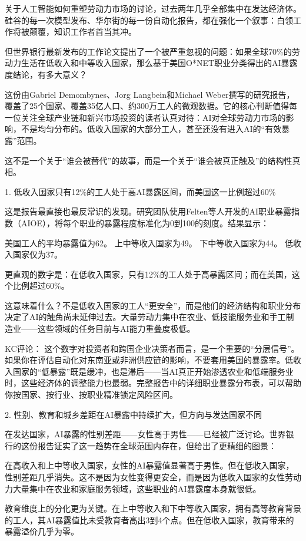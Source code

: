 \documentclass[11pt]{ctexart}
\begin{document}
关于人工智能如何重塑劳动力市场的讨论，过去两年几乎全部集中在发达经济体。硅谷的每一次模型发布、华尔街的每一份自动化报告，都在强化一个叙事：白领工作将被颠覆，知识工作者首当其冲。

但世界银行最新发布的工作论文提出了一个被严重忽视的问题：如果全球70\%的劳动力生活在低收入和中等收入国家，那么基于美国O*NET职业分类得出的AI暴露度结论，有多大意义？

这份由Gabriel Demombynes、Jorg Langbein和Michael Weber撰写的研究报告，覆盖了25个国家、覆盖35亿人口、约300万工人的微观数据。它的核心判断值得每一位关注全球产业链和新兴市场投资的读者认真对待：AI对全球劳动力市场的影响，不是均匀分布的。低收入国家的大部分工人，甚至还没有进入AI的“有效暴露”范围。

这不是一个关于“谁会被替代”的故事，而是一个关于“谁会被真正触及”的结构性真相。

1. 低收入国家只有12\%的工人处于高AI暴露区间，而美国这一比例超过60\%

这是报告最直接也最反常识的发现。研究团队使用Felten等人开发的AI职业暴露指数（AIOE），将每个职业的暴露程度标准化为0到100的刻度。结果显示：

美国工人的平均暴露值为62。 上中等收入国家为49。 下中等收入国家为44。 低收入国家仅为37。

更直观的数字是：在低收入国家，只有12\%的工人处于高暴露区间；而在美国，这个比例超过60\%。

这意味着什么？不是低收入国家的工人“更安全”，而是他们的经济结构和职业分布决定了AI的触角尚未延伸过去。大量劳动力集中在农业、低技能服务业和手工制造业——这些领域的任务目前与AI能力重叠度极低。

KC评论： 这个数字对投资者和跨国企业决策者而言，是一个重要的“分层信号”。如果你在评估自动化对东南亚或非洲供应链的影响，不要套用美国的暴露率。低收入国家的“低暴露”既是缓冲，也是滞后——当AI真正开始渗透农业和低端服务业时，这些经济体的调整能力也最弱。完整报告中的详细职业暴露分布表，可以帮助你按国家、按行业、按职业精准锁定风险区间。

2. 性别、教育和城乡差距在AI暴露中持续扩大，但方向与发达国家不同

在发达国家，AI暴露的性别差距——女性高于男性——已经被广泛讨论。世界银行的这份报告证实了这一趋势在全球范围内存在，但给出了更精细的图景：

在高收入和上中等收入国家，女性的AI暴露值显著高于男性。但在低收入国家，性别差距几乎消失。这不是因为女性变得更安全，而是因为低收入国家的女性劳动力大量集中在农业和家庭服务领域，这些职业的AI暴露度本身就很低。

教育维度上的分化更为关键。在上中等收入和下中等收入国家，拥有高等教育背景的工人，其AI暴露值比未受教育者高出3到4个点。但在低收入国家，教育带来的暴露溢价几乎为零。
\end{document}
